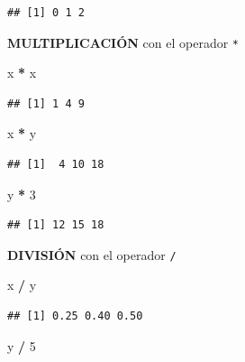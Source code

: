 \documentclass[
]{book}
\newenvironment{Shaded}{\begin{snugshade}}{\end{snugshade}}
\newcommand{\DecValTok}[1]{\textcolor[rgb]{0.00,0.00,0.81}{#1}}
\newcommand{\NormalTok}[1]{#1}
\newcommand{\SpecialCharTok}[1]{\textcolor[rgb]{0.81,0.36,0.00}{\textbf{#1}}}
\begin{document}
\begin{verbatim}
## [1] 0 1 2
\end{verbatim}

\textbf{MULTIPLICACIÓN} con el operador \texttt{*}

\begin{Shaded}
\begin{Highlighting}[]
\NormalTok{x }\SpecialCharTok{*}\NormalTok{ x}
\end{Highlighting}
\end{Shaded}

\begin{verbatim}
## [1] 1 4 9
\end{verbatim}

\begin{Shaded}
\begin{Highlighting}[]
\NormalTok{x }\SpecialCharTok{*}\NormalTok{ y }
\end{Highlighting}
\end{Shaded}

\begin{verbatim}
## [1]  4 10 18
\end{verbatim}

\begin{Shaded}
\begin{Highlighting}[]
\NormalTok{y }\SpecialCharTok{*} \DecValTok{3} 
\end{Highlighting}
\end{Shaded}

\begin{verbatim}
## [1] 12 15 18
\end{verbatim}

\textbf{DIVISIÓN} con el operador \texttt{/}

\begin{Shaded}
\begin{Highlighting}[]
\NormalTok{x }\SpecialCharTok{/}\NormalTok{ y}
\end{Highlighting}
\end{Shaded}

\begin{verbatim}
## [1] 0.25 0.40 0.50
\end{verbatim}

\begin{Shaded}
\begin{Highlighting}[]
\NormalTok{y }\SpecialCharTok{/} \DecValTok{5}
\end{Highlighting}
\end{Shaded}
\end{document}
